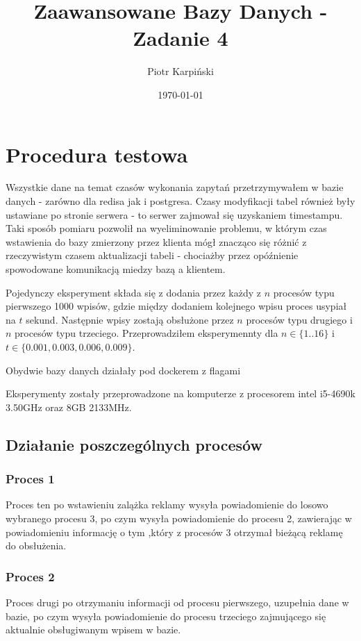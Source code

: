 \documentclass[10pt]{article}
\author{Piotr Karpiński}
\date{\today}
\title{Zaawansowane Bazy Danych - Zadanie 4}
\begin{document}
\maketitle

\section*{Procedura testowa}
Wszystkie dane na temat czasów wykonania zapytań przetrzymywałem w bazie danych - zarówno dla redisa jak i postgresa.  Czasy modyfikacji tabel również były ustawiane po stronie serwera - to serwer zajmował się uzyskaniem timestampu. Taki sposób pomiaru pozwolił na wyeliminowanie problemu, w którym czas wstawienia do bazy zmierzony przez klienta mógł znacząco się różnić z rzeczywistym czasem aktualizacji tabeli - chociażby przez opóźnienie spowodowane komunikacją miedzy bazą a klientem.

Pojedynczy eksperyment składa się z dodania przez każdy z $n$ procesów typu pierwszego 1000 wpisów, gdzie między dodaniem kolejnego wpisu proces usypiał na $t$ sekund. Następnie wpisy zostają obsłużone przez $n$ procesów typu drugiego i $n$ procesów typu trzeciego. Przeprowadziłem eksperymennty dla $n \in \{1..16\}$ i $t \in \{0.001, 0.003, 0.006, 0.009\}$.

Obydwie bazy danych działały pod dockerem z flagami 

Eksperymenty zostały przeprowadzone na komputerze z procesorem intel i5-4690k  3.50GHz oraz 8GB 2133MHz.


\subsection*{Działanie poszczególnych procesów}
\subsubsection*{Proces 1}
Proces ten po wstawieniu zalążka reklamy wysyła powiadomienie do losowo wybranego procesu 3, po czym wysyła powiadomienie do procesu 2, zawierając w powiadomieniu informację o tym ,który z procesów 3 otrzymał bieżącą reklamę do obsłużenia.

\subsubsection*{Proces 2}
Proces drugi po otrzymaniu informacji od procesu pierwszego, uzupełnia dane w bazie, po czym wysyła powiadomienie do procesu trzeciego zajmującego się aktualnie obsługiwanym wpisem w bazie.
\end{document}
